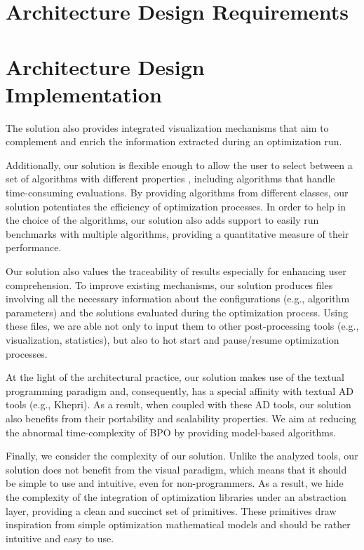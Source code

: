 \section{Architecture Design Requirements} 

\section{Architecture Design Implementation}



The solution also provides integrated visualization mechanisms that aim to complement and enrich the information extracted during an optimization run. 

Additionally, our solution is flexible enough to allow the user to select between a set of algorithms with different properties \cite{Wolpert1997NFLT}, including algorithms that handle time-consuming evaluations. By providing algorithms from different classes, our solution potentiates the efficiency of optimization processes. In order to help in the choice of the algorithms, our solution also adds support to easily run benchmarks with multiple algorithms, providing a quantitative measure of their performance. 

Our solution also values the traceability of results especially for enhancing user comprehension. To improve existing mechanisms, our solution produces files involving all the necessary information about the configurations (e.g., algorithm parameters) and the solutions evaluated during the optimization process. Using these files, we are able not only to input them to other post-processing tools (e.g., visualization, statistics), but also to hot start and pause/resume optimization processes.

At the light of the architectural practice, our solution makes use of the textual programming paradigm and, consequently, has a special affinity with textual \ac{AD} tools (e.g., Khepri). As a result, when coupled with these \ac{AD} tools, our solution also benefits from their portability and scalability properties. We aim at reducing the abnormal time-complexity of \ac{BPO} by providing model-based algorithms. 

Finally, we consider the complexity of our solution. Unlike the analyzed tools, our solution does not benefit from the visual paradigm, which means that it should be simple to use and intuitive, even for non-programmers. As a result, we hide the complexity of the integration of optimization libraries under an abstraction layer, providing a clean and succinct set of primitives. These primitives draw inspiration from simple optimization mathematical models and should be rather intuitive and easy to use. 


